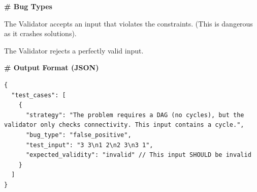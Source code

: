 \documentclass[11pt]{article}
\begin{document}
\begin{promptbox}
\vspace{0.5em}
\noindent\textbf{\# Bug Types}
\begin{description}
    \setlength\itemsep{0em}
    \item[False Positive (Too Loose)] The Validator accepts an input that violates the constraints. (This is dangerous as it crashes solutions).
    \item[False Negative (Too Strict)] The Validator rejects a perfectly valid input.
\end{description}

\noindent\textbf{\# Output Format (JSON)}
\begin{lstlisting}[style=jsonstyle]
{
  "test_cases": [
    {
      "strategy": "The problem requires a DAG (no cycles), but the validator only checks connectivity. This input contains a cycle.",
      "bug_type": "false_positive", 
      "test_input": "3 3\n1 2\n2 3\n3 1",
      "expected_validity": "invalid" // This input SHOULD be invalid
    }
  ]
}
\end{lstlisting}
\end{promptbox}
\end{document}
